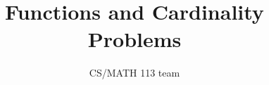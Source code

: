 \documentclass{exam}
\title{Functions and Cardinality Problems}
\author{CS/MATH 113 team}
\begin{document}
\maketitle

\begin{questions}
    
    
\end{questions}
\end{document}
